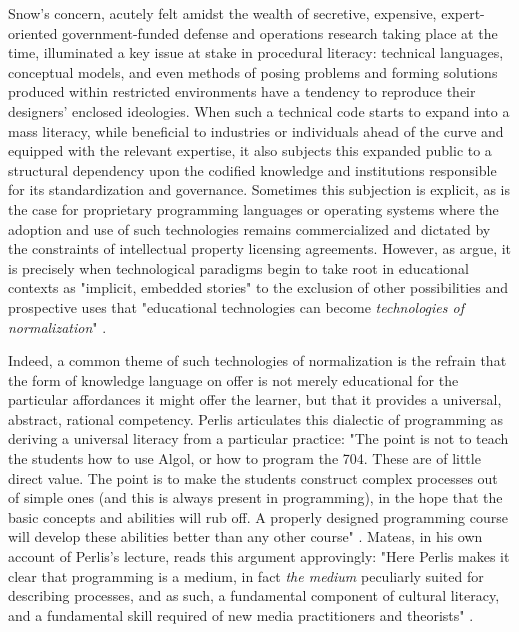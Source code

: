 Snow's concern, acutely felt amidst the wealth of secretive, expensive, expert-oriented government-funded defense and operations research taking place at the time, illuminated a key issue at stake in procedural literacy: technical languages, conceptual models, and even methods of posing problems and forming solutions produced within restricted environments have a tendency to reproduce their designers' enclosed ideologies. When such a technical code starts to expand into a mass literacy, while beneficial to industries or individuals ahead of the curve and equipped with the relevant expertise, it also subjects this expanded public to a structural dependency upon the codified knowledge and institutions responsible for its standardization and governance. Sometimes this subjection is explicit, as is the case for proprietary programming languages or operating systems where the adoption and use of such technologies remains commercialized and dictated by the constraints of intellectual property licensing agreements. However, as \citeauthor{Bryson1994} argue, it is precisely when technological paradigms begin to take root in educational contexts as "implicit, embedded stories" to the exclusion of other possibilities and prospective uses that "educational technologies can become \emph{technologies of normalization}" \autocite[217]{Bryson1994}.

Indeed, a common theme of such technologies of normalization is the refrain that the form of knowledge language on offer is not merely educational for the particular affordances it might offer the learner, but that it provides a universal, abstract, rational competency. Perlis articulates this dialectic of programming as deriving a universal literacy from a particular practice: "The point is not to teach the students how to use Algol, or how to program the 704. These are of little direct value. The point is to make the students construct complex processes out of simple ones (and this is always present in programming), in the hope that the basic concepts and abilities will rub off. A properly designed programming course will develop these abilities better than any other course" \autocite[206]{Perlis62}. Mateas, in his own account of Perlis's lecture, reads this argument approvingly: "Here Perlis makes it clear that programming is a medium, in fact \emph{the medium} peculiarly suited for describing processes, and as such, a fundamental component of cultural literacy, and a fundamental skill required of new media practitioners and theorists" \autocite*[7]{Mateas05}.

